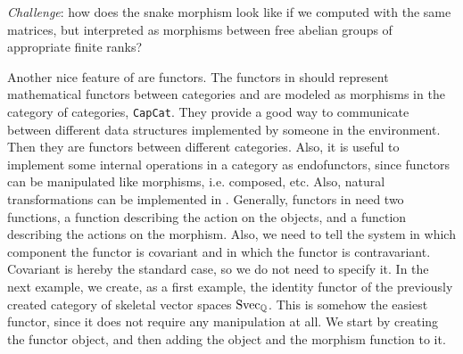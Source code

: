 \begin{center}
\end{center}

\begin{small}
 
\end{small}
\emph{Challenge}: how does the snake morphism look like if we computed with the same matrices, but interpreted 
as morphisms between free abelian groups of appropriate finite ranks?

Another nice feature of \CapPkg are functors. The functors in \CapPkg should represent mathematical functors between categories and are modeled
as morphisms in the \CapPkg category of categories, \texttt{CapCat}. They provide a good way to communicate between different data structures implemented
by someone in the \CapPkg environment. Then they are functors between different categories. Also, it is useful to implement some internal operations
in a category as endofunctors, since functors can be manipulated like morphisms, i.e. composed, etc. Also, natural transformations can be implemented in
\CapPkg. Generally, functors in \CapPkg need two functions, a function describing the action on the objects, and a function describing the actions on the
morphism. Also, we need to tell the system in which component the functor is covariant and in which the functor is contravariant. Covariant is hereby the standard
case, so we do not need to specify it.
In the next example, we create, as a first example, the identity functor of the previously created category of skeletal vector spaces $\mathrm{Svec}_{\mathbb{Q}}$. This is somehow the easiest functor,
since it does not require any manipulation at all. We start by creating the functor object, and then adding the object and the morphism function to it.

\begin{small}
 
\end{small}

